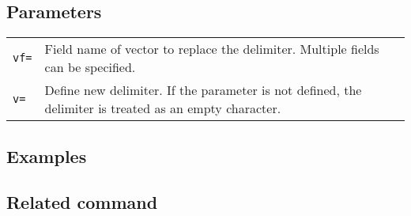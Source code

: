 \subsection*{Parameters}
\begin{table}[htbp]
{\small
\begin{tabular}{ll}
\verb|vf=|   & Field name of vector to replace the delimiter. Multiple fields can be specified. \\
\verb|v=|    & Define new delimiter. If the parameter is not defined, the delimiter is treated as an empty character.  \\
\end{tabular}
}
\end{table} 

\subsection*{Examples}


\subsection*{Related command}


%
